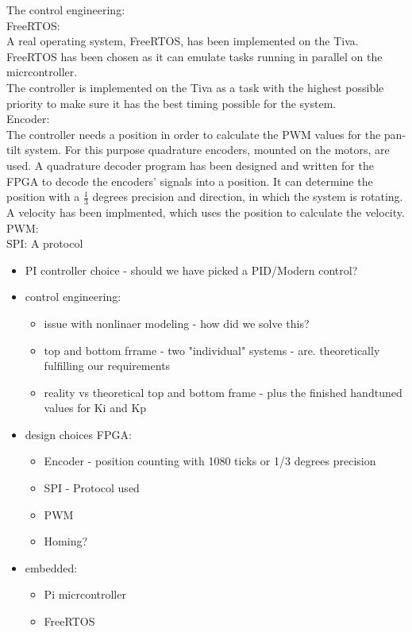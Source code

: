 \documentclass[../../main]{subfiles}
\begin{document}
The control engineering: \\

FreeRTOS:\\
A real operating system, FreeRTOS, has been implemented on the Tiva. FreeRTOS has been chosen as it can emulate tasks running in parallel on the micrcontroller. \\
The controller is implemented on the Tiva as a task with the highest possible priority to make sure it has the best timing possible for the system.
\\

Encoder:\\
The controller needs a position in order to calculate the PWM values for the pan-tilt system. For this purpose quadrature encoders, mounted on the motors, are used.
A quadrature decoder program has been designed and written for the FPGA to decode the encoders' signals into a position.
It can determine the position with a $\frac{1}{3}$ degrees precision and direction, in which the system is rotating. A velocity has been implmented, which uses the position to calculate the velocity.
\\

PWM:\\

SPI:
A protocol


\begin{itemize}
  \item PI controller choice - should we have picked a PID/Modern control?
  \item control engineering:
  \begin{itemize}
    \item issue with nonlinaer modeling - how did we solve this?
    \item top and bottom frrame - two "individual" systems - are. theoretically fulfilling our requirements
    \item reality vs theoretical top and bottom frame - plus the finished handtuned values for Ki and Kp
  \end{itemize}
  \item design choices FPGA:
    \begin{itemize}
      \item Encoder - position counting with 1080 ticks or 1/3 degrees precision
      \item SPI - Protocol used
      \item PWM
      \item Homing?
    \end{itemize}
  \item embedded:
  \begin{itemize}
    \item Pi micrcontroller
    \item FreeRTOS
  \end{itemize}


\end{itemize}
\end{document}
